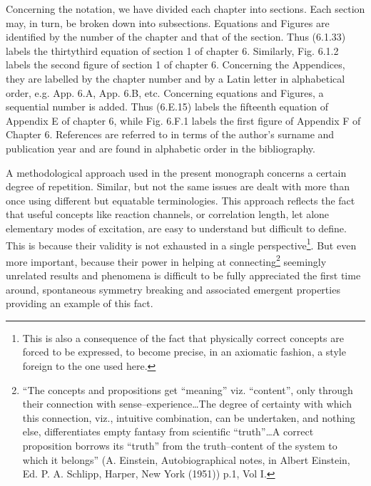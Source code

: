 Concerning the notation, we have divided each chapter into sections. Each section may, in turn, be broken down into subsections. Equations and Figures are identified by the number of the chapter and that of the section. Thus (6.1.33) labels the thirtythird equation of section 1 of chapter 6. Similarly, Fig. 6.1.2 labels the second figure of section 1 of chapter 6. Concerning the Appendices, they are labelled by the chapter number and by a Latin letter in alphabetical order, e.g. App. 6.A, App. 6.B, etc. Concerning equations and Figures, a sequential number is added. Thus (6.E.15) labels the fifteenth equation of Appendix E of chapter 6, while Fig. 6.F.1 labels the first figure of Appendix F of Chapter 6. References are referred to in terms of the author's surname and publication year and are found in alphabetic order in the bibliography.

A methodological approach used in the present monograph concerns a certain degree of repetition. Similar, but not the same issues are dealt with more than once using different but equatable terminologies. This approach reflects the fact that useful concepts like reaction channels, or correlation length, let alone elementary modes of excitation, are easy to understand but difficult to define. This is because their validity is not exhausted in a single perspective\footnote{This is also a consequence of the fact that physically correct concepts are forced to be expressed, to become precise, in an axiomatic fashion, a style foreign to the one used here.}. But even more important, because their power in helping at connecting\footnote{``The concepts and propositions get ``meaning'' viz. ``content'', only through their connection with sense--experience\dots The degree of certainty with which this connection, viz., intuitive combination, can be undertaken, and nothing else, differentiates empty fantasy from scientific ``truth''\dots A correct proposition borrows its ``truth'' from the truth--content of the system to which it belongs'' (A. Einstein, Autobiographical notes, in Albert Einstein, Ed. P. A. Schlipp, Harper, New York (1951)) p.1, Vol I.} seemingly unrelated results and phenomena is difficult to be fully appreciated the first time around, spontaneous symmetry breaking and associated emergent properties providing an example of this fact.


